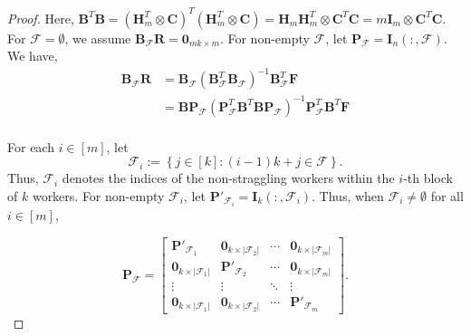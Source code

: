 \documentclass[10pt,a4paper]{amsart}
\newcommand{\bfB}{\mathbf{B}}
\newcommand{\bfC}{\mathbf{C}}
\newcommand{\bfI}{\mathbf{I}}
\newcommand{\bfP}{\mathbf{P}}
\newcommand{\bfR}{\mathbf{R}}
\newcommand{\cF}{\mathcal{F}}
\newcommand{\sifat}[1]{\marginpar{+}{\bf Sifat's remark}: {\em #1}}
\begin{document}
\begin{proof}

Here, 
$\mathbf{B}^T \mathbf{B} = (\mathbf{H}_m^T \otimes \mathbf{C})^T  (\mathbf{H}_m^T \otimes \mathbf{C}) = \mathbf{H}_m\mathbf{H}_m^T \otimes \mathbf{C}^T \mathbf{C} = m \mathbf{I}_m \otimes \mathbf{C}^T \bfC$. For $\cF =\emptyset$, we assume $\bfB_{\cF} \bfR = \mathbf{0}_{mk \times m}$. For non-empty $\cF$,  let $\bfP_{\cF} = \bfI_n(:, \cF)$. We have, 
\begin{align*}
\mathbf{B}_{\mathcal{F}}\mathbf{R} &= \bfB_{\cF}(\bfB_{\cF}^T\bfB_{\cF})^{-1} \bfB_{\cF}^T \mathbf{F}\\
&=\mathbf{B} \mathbf{P}_{\mathcal{F}}(\mathbf{P}_\mathcal{F}^T \mathbf{B}^T\mathbf{B}\mathbf{P}_\mathcal{F})^{-1}\mathbf{P}_{\mathcal{F}}^T \bfB^T\mathbf{F}\\
\end{align*}

For each $i\in[m]$, let
\[
\mathcal{F}_i
:=
\left\{
j\in[k] : (i-1)k+j\in\mathcal{F}
\right\}.
\]
Thus, $\mathcal{F}_i$ denotes the indices of the non-straggling workers within the $i$-th block of $k$ workers. For non-empty $\cF_i$, let $\bfP'_{\cF_i} = \bfI_k(:, \cF_i)$. Thus, when $\cF_i \ne \emptyset$ for all $i \in [m]$,

\[
\mathbf{P}_{\mathcal{F}}
=
\begin{bmatrix}
\mathbf{P}'_{\mathcal{F}_1}
    & \mathbf{0}_{k\times |\mathcal{F}_2|}
    & \cdots
    & \mathbf{0}_{k\times |\mathcal{F}_m|}\\
\mathbf{0}_{k\times |\mathcal{F}_1|}
    & \mathbf{P}'_{\mathcal{F}_2}
    & \cdots
    & \mathbf{0}_{k\times |\mathcal{F}_m|}\\
\vdots
    & \vdots
    & \ddots
    & \vdots\\
\mathbf{0}_{k\times |\mathcal{F}_1|}
    & \mathbf{0}_{k\times |\mathcal{F}_2|}
    & \cdots
    & \mathbf{P}'_{\mathcal{F}_m}
\end{bmatrix}.
\]


\end{proof}
\end{document}
